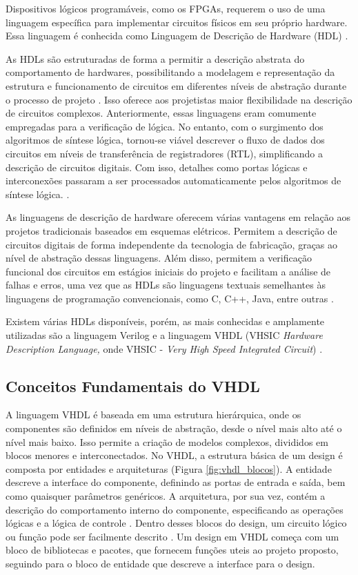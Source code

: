 Dispositivos lógicos programáveis, como os FPGAs, requerem o uso de uma linguagem específica para implementar circuitos físicos em seu próprio hardware. Essa linguagem é conhecida como Linguagem de Descrição de Hardware (HDL) \cite{ordonez2003projeto}.

As HDLs são estruturadas de forma a permitir a descrição abstrata do comportamento de hardwares, possibilitando a modelagem e representação da estrutura e funcionamento de circuitos em diferentes níveis de abstração durante o processo de projeto \cite{ordonez2003projeto}. Isso oferece aos projetistas maior flexibilidade na descrição de circuitos complexos. Anteriormente, essas linguagens eram comumente empregadas para a verificação de lógica. No entanto, com o surgimento dos algoritmos de síntese lógica, tornou-se viável descrever o fluxo de dados dos circuitos em níveis de transferência de registradores (RTL), simplificando a descrição de circuitos digitais. Com isso, detalhes como portas lógicas e interconexões passaram a ser processados automaticamente pelos algoritmos de síntese lógica. \cite{costa2014desenvolvimento}. 

As linguagens de descrição de hardware oferecem várias vantagens em relação aos projetos tradicionais baseados em esquemas elétricos. Permitem a descrição de circuitos digitais de forma independente da tecnologia de fabricação, graças ao nível de abstração dessas linguagens. Além disso, permitem a verificação funcional dos circuitos em estágios iniciais do projeto e facilitam a análise de falhas e erros, uma vez que as HDLs são linguagens textuais semelhantes às linguagens de programação convencionais, como C, C++, Java, entre outras \cite{costa2014desenvolvimento}. 

Existem várias HDLs disponíveis, porém, as mais conhecidas e amplamente utilizadas são a linguagem Verilog e a linguagem VHDL (VHSIC \textit{Hardware Description Language,} onde VHSIC - \textit{Very High Speed Integrated Circuit}) \cite{ordonez2003projeto}.


\subsection{Conceitos Fundamentais do VHDL}

A linguagem VHDL é baseada em uma estrutura hierárquica, onde os componentes são definidos em níveis de abstração, desde o nível mais alto até o nível mais baixo. Isso permite a criação de modelos complexos, divididos em blocos menores e interconectados. No VHDL, a estrutura básica de um design é composta por entidades e arquiteturas (Figura \ref{fig:vhdl_blocos}). A entidade descreve a interface do componente, definindo as portas de entrada e saída, bem como quaisquer parâmetros genéricos. A arquitetura, por sua vez, contém a descrição do comportamento interno do componente, especificando as operações lógicas e a lógica de controle \cite{harris2015digital}. Dentro desses blocos do design, um circuito lógico ou função pode ser facilmente descrito \cite{sousa2017projeto}. Um design em VHDL começa com um bloco de bibliotecas e pacotes, que fornecem funções uteis ao projeto proposto, seguindo para o bloco de entidade que descreve a interface para o design.

